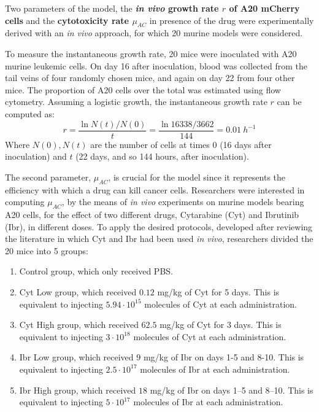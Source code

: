 Two parameters of the model, the \textbf{\textit{in vivo} growth rate $r$ of A20 mCherry cells} and the \textbf{cytotoxicity rate $\mu_{AC}$} in presence of the drug were experimentally derived with an \textit{in vivo} approach, for which 20 murine models were considered. \par
\vspace{0.4cm}
To measure the instantaneous growth rate, 20 mice were inoculated with A20 murine leukemic cells. On day 16 after inoculation, blood was collected from the tail veins of four randomly chosen mice, and again on day 22 from four other mice. The proportion of A20 cells over the total was estimated using flow cytometry. Assuming a logistic growth, the instantaneous growth rate $r$ can be computed as: 
\[ r = \frac{\ln{N(t)/N(0)}}{t} = \frac{\ln{16338/3662}}{144} = 0.01\ h^{-1} \]
Where $N(0), N(t)$ are the number of cells at times $0$ (16 days after inoculation) and $t$ (22 days, and so 144 hours, after inoculation).\\ \par
\vspace{0.4cm}
The second parameter, $\mu_{AC}$, is crucial for the model since it represents the efficiency with which a drug can kill cancer cells. Researchers were interested in computing $\mu_{AC}$, by the means of \textit{in vivo} experiments on murine models bearing A20 cells, for the effect of two different drugs, Cytarabine (Cyt) and Ibrutinib (Ibr), in different doses. To apply the desired protocols, developed after reviewing the literature in which Cyt and Ibr had been used \textit{in vivo}, researchers divided the 20 mice into 5 groups:\begin{enumerate}
	\item Control group, which only received PBS.
	\item Cyt Low group, which received $0.12$ mg/kg of Cyt for 5 days. This is equivalent to injecting $5.94 \cdot 10^{15}$ molecules of Cyt at each
	administration. 
	\item Cyt High group, which received $62.5$ mg/kg of Cyt for 3 days. This is equivalent to injecting $3 \cdot 10^{18}$ molecules of Cyt at each
	administration. 
	\item Ibr Low group, which received $9$ mg/kg of Ibr on days 1-5 and 8-10. This is equivalent to injecting $2.5 \cdot 10^{17}$ molecules of Ibr at 
	each administration. 
	\item Ibr High group, which received $18$ mg/kg of Ibr on days 1–5 and 8–10. This is equivalent to injecting $5 \cdot 10^{17}$ molecules of Ibr at 
	each administration. 
\end{enumerate}
